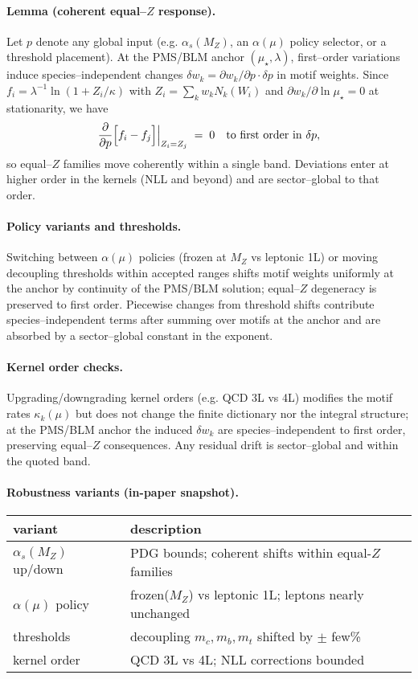 \documentclass[epjc3]{svjour3}
\begin{document}
\paragraph{Lemma (coherent equal--$Z$ response).}
Let $p$ denote any global input (e.g. $\alpha_s(M_Z)$, an $\alpha(\mu)$ policy selector, or a threshold placement). At the PMS/BLM anchor $(\mu_\star,\lambda)$, first--order variations induce species--independent changes $\delta w_k=\partial w_k/\partial p\cdot\delta p$ in motif weights. Since $f_i=\lambda^{-1}\ln(1+Z_i/\kappa)$ with $Z_i=\sum_k w_k N_k(W_i)$ and $\partial w_k/\partial\ln\mu_\star=0$ at stationarity, we have
\[
  \frac{\partial}{\partial p}\Bigl[f_i- f_j\Bigr]\Big|_{Z_i=Z_j}\;=\;0\quad\text{to first order in }\delta p,
\]
so equal--$Z$ families move coherently within a single band. Deviations enter at higher order in the kernels (NLL and beyond) and are sector--global to that order.

\paragraph{Policy variants and thresholds.}
Switching between $\alpha(\mu)$ policies (frozen at $M_Z$ vs leptonic 1L) or moving decoupling thresholds within accepted ranges shifts motif weights uniformly at the anchor by continuity of the PMS/BLM solution; equal--$Z$ degeneracy is preserved to first order. Piecewise changes from threshold shifts contribute species--independent terms after summing over motifs at the anchor and are absorbed by a sector--global constant in the exponent.

\paragraph{Kernel order checks.}
Upgrading/downgrading kernel orders (e.g. QCD 3L vs 4L) modifies the motif rates $\kappa_k(\mu)$ but does not change the finite dictionary nor the integral structure; at the PMS/BLM anchor the induced $\delta w_k$ are species--independent to first order, preserving equal--$Z$ consequences. Any residual drift is sector--global and within the quoted band.

\paragraph{Robustness variants (in-paper snapshot).}
\begin{center}
\begin{tabular}{l l}
\toprule
variant & description \\ \midrule
$\alpha_s(M_Z)$ up/down & PDG bounds; coherent shifts within equal-$Z$ families \\
$\alpha(\mu)$ policy & frozen($M_Z$) vs leptonic 1L; leptons nearly unchanged \\
thresholds & decoupling $m_c,m_b,m_t$ shifted by $\pm$ few\% \\
kernel order & QCD 3L vs 4L; NLL corrections bounded \\
\bottomrule
\end{tabular}
\end{center}
\end{document}
